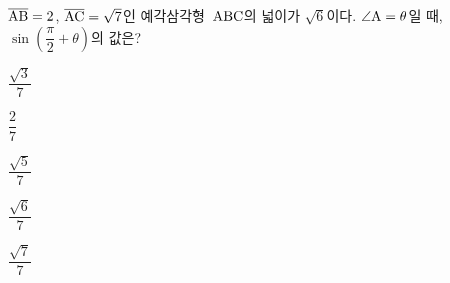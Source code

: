 $\overline{\mathrm{AB}}=2$, $\overline{\mathrm{AC}}=\sqrt{7}$인 예각삼각형~$\mathrm{ABC}$의 넓이가 $\sqrt{6}$이다. $\angle\mathrm{A}=\theta$일 때, $\sin\left(\dfrac{\pi}{2}+\theta\right)$의 값은?
\begin{choices32}{\rule[-3ex]{0pt}{8ex}$\dfrac{\sqrt{3}}{7}$}{\rule[-3ex]{0pt}{8ex}$\dfrac{2}{7}$}{\rule[-3ex]{0pt}{8ex}$\dfrac{\sqrt{5}}{7}$}{\rule[-3ex]{0pt}{8ex}$\dfrac{\sqrt{6}}{7}$}{\rule[-3ex]{0pt}{8ex}$\dfrac{\sqrt{7}}{7}$}\end{choices32}
